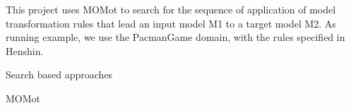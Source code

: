 This project uses MOMot to search for the sequence of application of model transformation rules that lead an input model M1 to a target model M2. As running example, we use the PacmanGame domain, with the rules specified in Henshin.


Search based approaches

MOMot